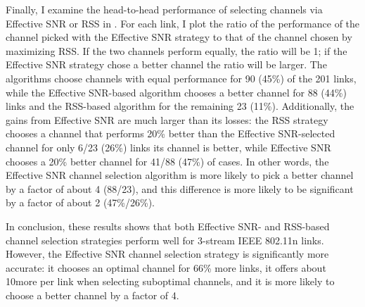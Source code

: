Finally, I examine the head-to-head performance of selecting channels via Effective SNR or RSS in . For each link, I plot the ratio of the performance of the channel picked with the Effective SNR strategy to that of the channel chosen by maximizing RSS\@. If the two channels perform equally, the ratio will be 1; if the Effective SNR strategy chose a better channel the ratio will be larger. The algorithms choose channels with equal performance for 90 (45\%) of the 201 links, while the Effective SNR-based algorithm chooses a better channel for 88 (44\%) links and the RSS-based algorithm for the remaining 23 (11\%). Additionally, the gains from Effective SNR are much larger than its losses: the RSS strategy chooses a channel that performs 20\% better than the Effective SNR-selected channel for only 6/23 (26\%) links its channel is better, while Effective SNR chooses a 20\% better channel for 41/88 (47\%) of cases. In other words, the Effective SNR channel selection algorithm is more likely to pick a better channel by a factor of about 4 (88/23), and this difference is more likely to be significant by a factor of about 2 (47\%/26\%).

In conclusion, these results shows that both Effective SNR- and RSS-based channel selection strategies perform well for 3-stream IEEE 802.11n links. However, the Effective SNR channel selection strategy is significantly more accurate: it chooses an optimal channel for 66\% more links, it offers about 10\Mbps more per link when selecting suboptimal channels, and it is more likely to choose a better channel by a factor of 4.

